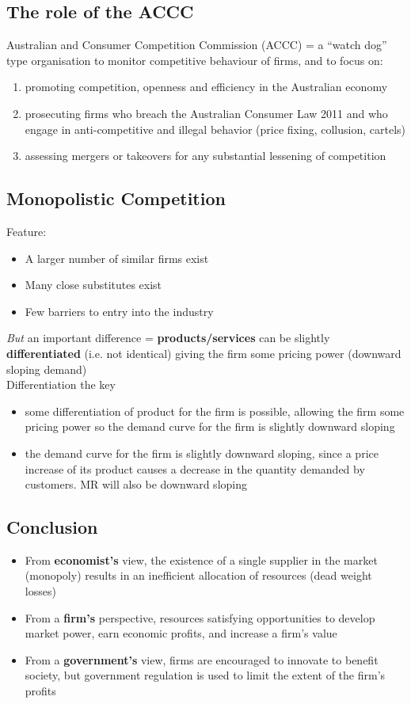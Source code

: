 \subsection{The role of the ACCC}
Australian and Consumer Competition Commission (ACCC) = a ``watch dog'' type organisation to monitor competitive behaviour of firms, and to focus on:
\begin{enumerate}
	\item promoting competition, openness and efficiency in the Australian economy
	\item prosecuting firms who breach the Australian Consumer Law 2011 and who engage in anti-competitive and illegal behavior (price fixing, collusion, cartels)
	\item assessing mergers or takeovers for any substantial lessening of competition
\end{enumerate}

\subsection{Monopolistic Competition}
Feature:
\begin{itemize}
	\item A larger number of similar firms exist
	\item Many close substitutes exist
	\item Few barriers to entry into the industry
\end{itemize}
\textit{But} an important difference = \textbf{products/services} can be slightly \textbf{differentiated} (i.e. not identical) giving the firm some pricing power (downward sloping demand)\\
Differentiation the key
\begin{itemize}
	\item some differentiation of product for the firm is possible, allowing the firm some pricing power so the demand curve for the firm is slightly downward sloping
	\item the demand curve for the firm is slightly downward sloping, since a price increase of its product causes a decrease in the quantity demanded by customers. MR will also be downward sloping
\end{itemize}

\subsection{Conclusion}
\begin{itemize}
	\item From \textbf{economist's} view, the existence of a single supplier in the market (monopoly) results in an inefficient allocation of resources (dead weight losses)
	\item From a \textbf{firm's} perspective, resources satisfying opportunities to develop market power, earn economic profits, and increase a firm's value
	\item From a \textbf{government's} view, firms are encouraged to innovate to benefit society, but government regulation is used to limit the extent of the firm's profits
\end{itemize}